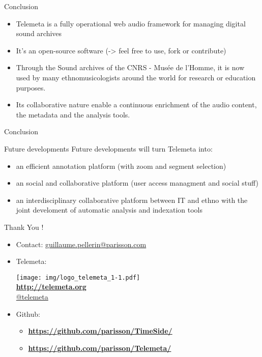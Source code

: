 \documentclass[final, hyperref, table]{beamer}
\begin{document}
\begin{frame}{Conclusion}
  \begin{block}{}
    \begin{itemize}[<+->]
    \item Telemeta is a \alert{fully operational} web audio framework
      for managing digital sound archives
    \item It's an \alert{open-source} software (-> feel free to use,
      fork or contribute)
    \item Through the Sound archives of the CNRS - Musée de l’Homme,
      it is now used by many ethnomusicologists around the world for
      research or education purposes.
    \item Its collaborative nature enable a \alert{continuous
        enrichment} of the audio content, the metadata and the
      analysis tools.
    \end{itemize}
  \end{block}
\end{frame}
\begin{frame}{Conclusion}
  \begin{block}{Future developments}
Future developments will turn Telemeta into:
    \begin{itemize}
    \item an efficient \alert{annotation platform} (with zoom and segment selection)
    \item an \alert{social and collaborative platform} (user access managment and social stuff)
    \item an \alert{interdisciplinary} collaborative platform between IT and ethno with the joint develoment of automatic analysis and indexation tools
    \end{itemize}
  \end{block}
\end{frame}
\begin{frame}{Thank You !}
  \begin{itemize}
  \item Contact: \url{guillaume.pellerin@parisson.com}
  \item Telemeta:
    \begin{center}
    \texttt{[image: img/logo\_telemeta\_1-1.pdf]}\\
      \colorbox{yellow!40}{\textbf{\url{http://telemeta.org}}}\\
      \colorbox{yellow!40}{\href{https://twitter.com/telemeta/}{@telemeta}}
    \end{center}

  \item Github:
    \begin{itemize}
    \item \colorbox{yellow!40}{\bf
        \url{https://github.com/parisson/TimeSide/}}
    \item \colorbox{yellow!40}{\bf
        \url{https://github.com/parisson/Telemeta/}}
    \end{itemize}

  \end{itemize}
\end{frame}
\end{document}
